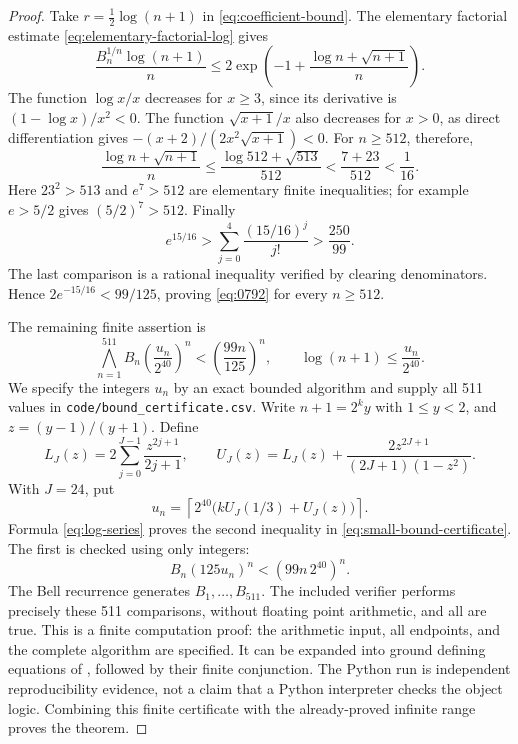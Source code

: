 \begin{proof}
Take $r=\tfrac12\log(n+1)$ in
\eqref{eq:coefficient-bound}.  The elementary factorial estimate
\eqref{eq:elementary-factorial-log} gives
\begin{equation}\label{eq:0792-envelope}
 \frac{B_n^{1/n}\log(n+1)}n
 \le2\exp\left(-1+\frac{\log n+\sqrt{n+1}}n\right).
\end{equation}
The function $\log x/x$ decreases for $x\ge3$, since its derivative is
$(1-\log x)/x^2<0$.  The function $\sqrt{x+1}/x$ also decreases for $x>0$,
as direct differentiation gives
$-(x+2)/(2x^2\sqrt{x+1})<0$.
For $n\ge512$, therefore,
\[
 \frac{\log n+\sqrt{n+1}}n
 \le\frac{\log512+\sqrt{513}}{512}
 <\frac{7+23}{512}<\frac1{16}.
\]
Here $23^2>513$ and $e^7>512$ are elementary finite inequalities; for
example $e>5/2$ gives $(5/2)^7>512$.  Finally
\[
 e^{15/16}>\sum_{j=0}^{4}\frac{(15/16)^j}{j!}>\frac{250}{99}.
\]
The last comparison is a rational inequality verified by clearing
denominators.  Hence $2e^{-15/16}<99/125$, proving
\eqref{eq:0792} for every $n\ge512$.

The remaining finite assertion is
\begin{equation}\label{eq:small-bound-certificate}
 \bigwedge_{n=1}^{511}
 B_n\left(\frac{u_n}{2^{40}}\right)^n
       <\left(\frac{99n}{125}\right)^n,
 \qquad \log(n+1)\le\frac{u_n}{2^{40}}.
\end{equation}
We specify the integers $u_n$ by an exact bounded algorithm and supply all
511 values in \texttt{code/bound\_certificate.csv}.
Write $n+1=2^k y$ with $1\le y<2$, and $z=(y-1)/(y+1)$.  Define
\[
 L_J(z)=2\sum_{j=0}^{J-1}\frac{z^{2j+1}}{2j+1},\qquad
 U_J(z)=L_J(z)+\frac{2z^{2J+1}}{(2J+1)(1-z^2)}.
\]
With $J=24$, put
\[
 u_n=\left\lceil2^{40}\bigl(kU_J(1/3)+U_J(z)\bigr)\right\rceil.
\]
Formula \eqref{eq:log-series} proves the second inequality in
\eqref{eq:small-bound-certificate}.  The first is checked using only integers:
\begin{equation}\label{eq:certificate-integer-test}
 B_n(125u_n)^n<(99n\,2^{40})^n.
\end{equation}
The Bell recurrence generates $B_1,\ldots,B_{511}$.  The included verifier
performs precisely these 511 comparisons, without floating point arithmetic,
and all are true.  This is a finite computation proof: the arithmetic input,
all endpoints, and the complete algorithm are specified.  It can be expanded
into ground defining equations of \ipra, followed by their finite conjunction.
The Python run is independent reproducibility evidence, not a claim that a
Python interpreter checks the object logic.  Combining this finite certificate
with the already-proved infinite range proves the theorem.
\end{proof}

